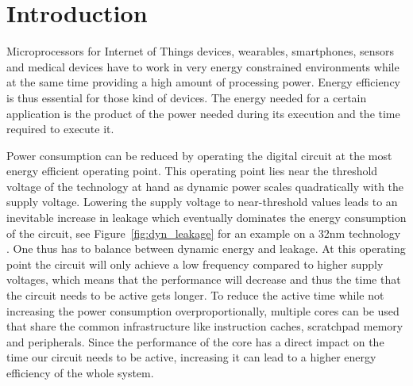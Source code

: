 
\chapter{Introduction}

Microprocessors for Internet of Things devices, wearables, smartphones, sensors and
medical devices have to work in very energy constrained environments while at
the same time providing a high amount of processing power.
Energy efficiency is thus essential for those kind of devices.
The energy needed for a certain application is the product of the power needed
during its execution and the time required to execute it.

Power consumption can be reduced by operating the digital circuit at the most
energy efficient operating point. This operating point lies near the threshold
voltage of the technology at hand \cite{NTC} as dynamic power scales
quadratically with the supply voltage. Lowering the supply voltage to
near-threshold values leads to an inevitable increase in leakage which
eventually dominates the energy consumption of the circuit, see
Figure~\ref{fig:dyn_leakage} for an example on a 32nm technology \cite{VIVEK}.
One thus has to balance between dynamic energy and leakage. At this operating
point the circuit will only achieve a low frequency compared to higher supply
voltages, which means that the performance will decrease and thus the time that
the circuit needs to be active gets longer. To reduce the active time while not
increasing the power consumption overproportionally, multiple cores can be used
that share the common infrastructure like instruction caches, scratchpad memory
and peripherals. Since the performance of the core has a direct impact on the
time our circuit needs to be active, increasing it can lead to a higher energy
efficiency of the whole system.

